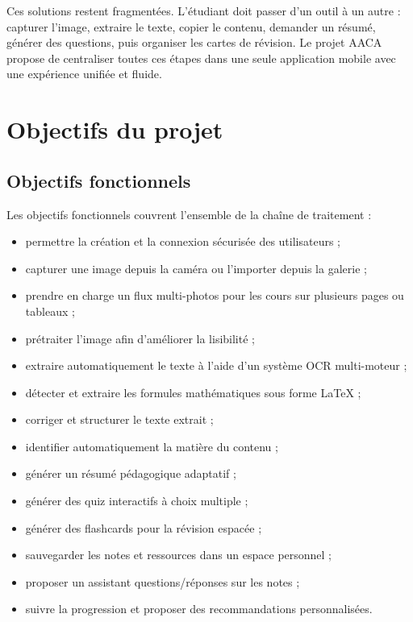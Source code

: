 \documentclass[12pt,a4paper]{report}
\begin{document}
Ces solutions restent fragmentées. L'étudiant doit passer d'un outil à un autre : capturer l'image, extraire le texte, copier le contenu, demander un résumé, générer des questions, puis organiser les cartes de révision. Le projet AACA propose de centraliser toutes ces étapes dans une seule application mobile avec une expérience unifiée et fluide.

\section{Objectifs du projet}

\subsection{Objectifs fonctionnels}

Les objectifs fonctionnels couvrent l'ensemble de la chaîne de traitement :

\begin{itemize}[label=--]
    \item permettre la création et la connexion sécurisée des utilisateurs ;
    \item capturer une image depuis la caméra ou l'importer depuis la galerie ;
    \item prendre en charge un flux multi-photos pour les cours sur plusieurs pages ou tableaux ;
    \item prétraiter l'image afin d'améliorer la lisibilité ;
    \item extraire automatiquement le texte à l'aide d'un système OCR multi-moteur ;
    \item détecter et extraire les formules mathématiques sous forme LaTeX ;
    \item corriger et structurer le texte extrait ;
    \item identifier automatiquement la matière du contenu ;
    \item générer un résumé pédagogique adaptatif ;
    \item générer des quiz interactifs à choix multiple ;
    \item générer des flashcards pour la révision espacée ;
    \item sauvegarder les notes et ressources dans un espace personnel ;
    \item proposer un assistant questions/réponses sur les notes ;
    \item suivre la progression et proposer des recommandations personnalisées.
\end{itemize}
\end{document}
